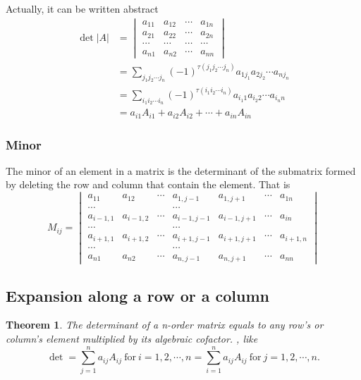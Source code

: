 \documentclass{article}
\newtheorem{theorem}{Theorem}[section]
\theoremstyle{definition}
\begin{document}
Actually, it can be written abstract
\begin{align*}
\det |A|  
& =
\begin{vmatrix}
    a_{11} & a_{12} & \cdots & a_{1n}\\
    a_{21} & a_{22} & \cdots & a_{2n}\\
    \cdots & \cdots & \cdots & \cdots\\
    a_{n1} & a_{n2} & \cdots & a_{nn}
\end{vmatrix} \\
& = \sum_{j_{1}j_{2}\cdots j_{n}}(-1)^{\tau (j_{1}j_{2}\cdots j_{n})} a_{1j_{1}}a_{2j_{2}}\cdots a_{nj_{n}} \\
& = \sum_{i_{1}i_{2}\cdots i_{n}}(-1)^{\tau (i_{1}i_{2}\cdots i_{n})} a_{i_{1}1}a_{i_{2}2}\cdots a_{i_{n}n} \\
& = a_{i1}A_{i1}+a_{i2}A_{i2}+\cdots+a_{in}A_{in}
\end{align*}

\subsubsection{Minor}
The minor of an element in a matrix is the determinant 
of the submatrix formed by deleting the 
row and column that contain the element.
That is 
$$M_{ij}=
\begin{vmatrix}
    a_{11} & a_{12} & \cdots & a_{1,j-1} & a_{1,j+1} & \cdots & a_{1n}\\
    \cdots &  &  & \cdots\\
    a_{i-1,1} & a_{i-1,2} & \cdots & a_{i-1,j-1} & a_{i-1,j+1} & \cdots & a_{in}\\
    \cdots &  &  & \cdots\\
    a_{i+1,1} & a_{i+1,2} & \cdots & a_{i+1,j-1} & a_{i+1,j+1} & \cdots & a_{i+1,n}\\
    \cdots &  &  & \cdots\\
    a_{n1} & a_{n2} & \cdots & a_{n,j-1} & a_{n,j+1} & \cdots & a_{nn}
\end{vmatrix}$$


\subsection{Expansion along a row or a column}
\begin{theorem}
    The determinant of a n-order matrix equals to any row's or column's 
    element multiplied by its algebraic cofactor.
    , like
    $$\det = \sum_{j=1}^{n}a_{ij}A_{ij}\ \text{for}\ i=1,2,\cdots,n = \sum_{i=1}^{n}a_{ij}A_{ij}\ \text{for}\ j=1,2,\cdots,n.$$
\end{theorem}
\end{document}
